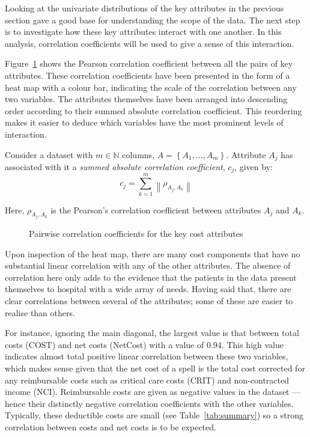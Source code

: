 Looking at the univariate distributions of the key attributes in the previous
section gave a good base for understanding the scope of the data. The next step
is to investigate how these key attributes interact with one another. In this
analysis, correlation coefficients will be used to give a sense of this
interaction.

Figure~\ref{fig:corr_heatmap} shows the Pearson correlation coefficient between
all the pairs of key attributes. These correlation coefficients have been
presented in the form of a heat map with a colour bar, indicating the scale of
the correlation between any two variables. The attributes themselves have been
arranged into descending order according to their summed absolute correlation
coefficient. This reordering makes it easier to deduce which variables have the
most prominent levels of interaction.

\begin{definition}
    Consider a dataset with \(m \in \mathbb{N}\) columns,
    \(A = \left\{A_1, \ldots, A_m\right\}\). Attribute \(A_j\) has
    associated with it a \emph{summed absolute correlation coefficient},
    \(c_j\), given by:
    \begin{equation}\label{eq:abs_corr}
        c_j = \sum_{k=1}^{m} \left\| \rho_{A_j, A_k} \right\|
    \end{equation}

    Here, \(\rho_{A_j, A_k}\) is the Pearson's correlation coefficient
    between attributes \(A_j\) and \(A_k\).
\end{definition}

\begin{figure}
    \caption{%
        Pairwise correlation coefficients for the key cost attributes
    }\label{fig:corr_heatmap}
\end{figure}

Upon inspection of the heat map, there are many cost components that have no
substantial linear correlation with any of the other attributes. The absence of
correlation here only adds to the evidence that the patients in the data present
themselves to hospital with a wide array of needs. Having said that, there are
clear correlations between several of the attributes; some of these are easier
to realise than others.

For instance, ignoring the main diagonal, the largest value is that between
total costs (COST) and net costs (NetCost) with a value of 0.94. This high value
indicates almost total positive linear correlation between these two variables,
which makes sense given that the net cost of a spell is the total cost corrected
for any reimbursable costs such as critical care costs (CRIT) and non-contracted
income (NCI). Reimbursable costs are given as negative values in the dataset ---
hence their distinctly negative correlation coefficients with the other
variables. Typically, these deductible costs are small (see
Table~\ref{tab:summary}) so a strong correlation between costs and net costs is
to be expected.

